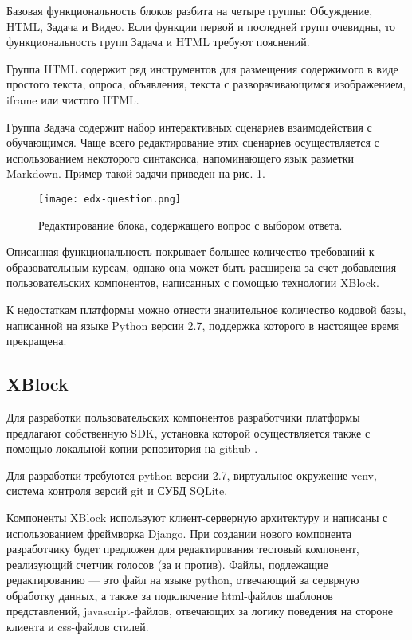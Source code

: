 Базовая функциональность блоков разбита на четыре группы: Обсуждение, HTML, Задача и Видео. Если функции первой и последней групп очевидны, то функциональность групп Задача и HTML требуют пояснений.


Группа HTML содержит ряд инструментов для размещения содержимого в виде простого текста, опроса, объявления, текста с разворачивающимся изображением, iframe или чистого HTML. 

Группа Задача содержит набор интерактивных сценариев взаимодействия с обучающимся. Чаще всего редактирование этих сценариев осуществляется с использованием некоторого синтаксиса, напоминающего язык разметки Markdown. Пример такой задачи приведен на рис. \ref{fig:edx-question}.


\begin{figure}[htbp]
	\centering
	\texttt{[image: edx-question.png]}
	\caption{Редактирование блока, содержащего вопрос с выбором ответа.}%
	\label{fig:edx-question}
\end{figure}

Описанная функциональность покрывает большее количество требований к образовательным курсам, однако она может быть расширена за счет добавления пользовательских компонентов, написанных с помощью технологии XBlock.

К недостаткам платформы можно отнести значительное количество кодовой базы, написанной на языке Python версии 2.7, поддержка которого в настоящее время прекращена.

\subsection{XBlock}

Для разработки пользовательских компонентов разработчики платформы предлагают собственную SDK, установка которой осуществляется также с помощью локальной копии репозитория на github \cite{sdk-github}.


Для разработки требуются python версии 2.7, виртуальное окружение venv, система
контроля версий git и СУБД SQLite.


Компоненты XBlock используют клиент-серверную архитектуру и написаны с использованием фреймворка Django. При создании нового компонента разработчику будет предложен для редактирования тестовый компонент, реализующий счетчик голосов (за и против). Файлы, подлежащие редактированию — это файл на языке python, отвечающий за серврную обработку данных, а также за подключение html-файлов шаблонов представлений, javascript-файлов, отвечающих за логику поведения на стороне клиента и css-файлов стилей.

